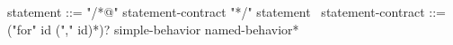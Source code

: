 \begin{syntax}
  statement ::= "/*@" statement-contract "*/" statement
  \
  statement-contract ::= {("for" id ("," id)*)?}
    simple-behavior named-behavior*
\end{syntax}
